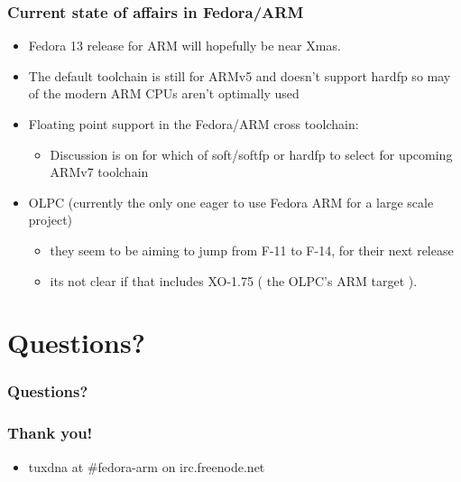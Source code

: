 \documentclass[11pt]{beamer}
\begin{document}
\begin{frame}[fragile]\frametitle{Current state of affairs in Fedora/ARM}
\label{sec-5.4}

\begin{itemize}

\item Fedora 13 release for ARM will hopefully be near Xmas.\\
\label{sec-5.4.1}


\item The default toolchain is still for ARMv5 and doesn't support hardfp so may of the modern ARM CPUs aren't optimally used\\
\label{sec-5.4.2}


\item Floating point support in the Fedora/ARM cross toolchain:\\
\label{sec-5.4.3}

\begin{itemize}

\item Discussion is on for which of soft/softfp or hardfp to select for upcoming ARMv7 toolchain\\
\label{sec-5.4.3.1}

\end{itemize} %

\item OLPC (currently the only one eager to use Fedora ARM for a large scale project)\\
\label{sec-5.4.4}

\begin{itemize}

\item they seem to be aiming to jump from F-11 to F-14, for their next release\\
\label{sec-5.4.4.1}


\item its not clear if that includes XO-1.75 ( the OLPC's ARM target ).\\
\label{sec-5.4.4.2}



\end{itemize} %
\end{itemize} %
\end{frame}
\section{Questions?}
\label{sec-6}


\begin{frame}[fragile]\frametitle{Questions?}
\label{sec-6.1}


\end{frame}
\begin{frame}[fragile]\frametitle{Thank you!}
\label{sec-6.2}

\begin{itemize}

\item tuxdna at \#fedora-arm on irc.freenode.net\\
\label{sec-6.2.1}

\end{itemize} %
\end{frame}
\end{document}

